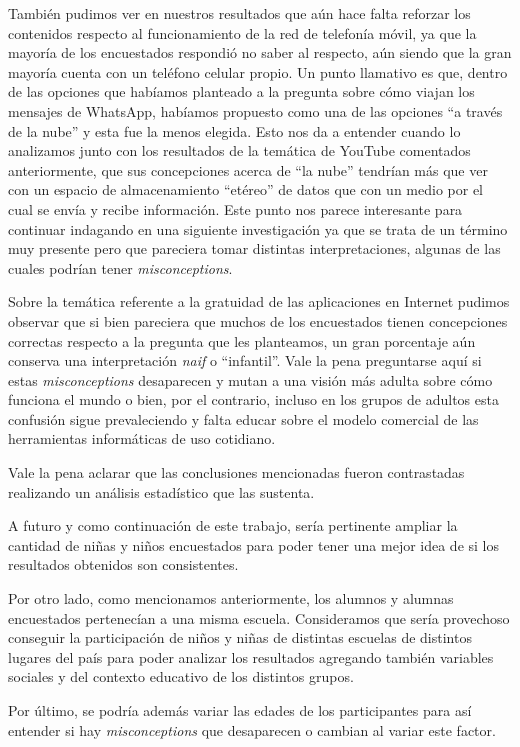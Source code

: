 También pudimos ver en nuestros resultados que aún hace falta reforzar los contenidos respecto al funcionamiento de la red de telefonía móvil, ya que la mayoría de los encuestados respondió no saber al respecto, aún siendo que la gran mayoría cuenta con un teléfono celular propio. Un punto llamativo es que, dentro de las opciones que habíamos planteado a la pregunta sobre cómo viajan los mensajes de WhatsApp, habíamos propuesto como una de las opciones “a través de la nube” y esta fue la menos elegida. Esto nos da a entender cuando lo analizamos junto con los resultados de la temática de YouTube comentados anteriormente, que sus concepciones acerca de ``la nube'' tendrían más que ver con un espacio de almacenamiento ``etéreo'' de datos que con un medio por el cual se envía y recibe información. Este punto nos parece interesante para continuar indagando en una siguiente investigación ya que se trata de un término muy presente pero que pareciera tomar distintas interpretaciones, algunas de las cuales podrían tener \textit{misconceptions}.

Sobre la temática referente a la gratuidad de las aplicaciones en Internet pudimos observar que si bien pareciera que muchos de los encuestados tienen concepciones correctas respecto a la pregunta que les planteamos, un gran porcentaje aún conserva una interpretación \textit{naif} o “infantil”. Vale la pena preguntarse aquí si estas \textit{misconceptions} desaparecen y mutan a una visión más adulta sobre cómo funciona el mundo o bien, por el contrario, incluso en los grupos de adultos esta confusión sigue prevaleciendo y falta educar sobre el modelo comercial de las herramientas informáticas de uso cotidiano.

Vale la pena aclarar que las conclusiones mencionadas fueron contrastadas realizando un análisis estadístico que las sustenta.

A futuro y como continuación de este trabajo, sería pertinente ampliar la cantidad de niñas y niños encuestados para poder tener una mejor idea de si los resultados obtenidos son consistentes.

Por otro lado, como mencionamos anteriormente, los alumnos y alumnas encuestados pertenecían a una misma escuela. Consideramos que sería provechoso conseguir la participación de niños y niñas de distintas escuelas de distintos lugares del país para poder analizar los resultados agregando también variables sociales y del contexto educativo de los distintos grupos.

Por último, se podría además variar las edades de los participantes para así entender si hay \textit{misconceptions} que desaparecen o cambian al variar este factor.
